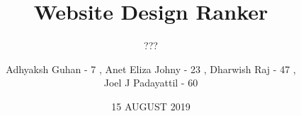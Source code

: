 \documentclass[11pt]{beamer}
\begin{document}
	\title{\textbf{Website Design Ranker}}
	\subtitle{???}
	\date{15 AUGUST 2019}
	\author{{\scriptsize Adhyaksh Guhan - 7 , Anet Eliza Johny - 23 , Dharwish Raj - 47 , \\ Joel J Padayattil - 60}}
	\begin{frame}[plain]
		\maketitle
	\end{frame}
\end{document}
